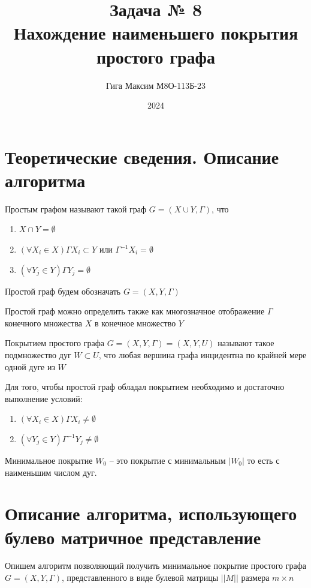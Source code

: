 \documentclass[12pt]{article}
\title{Задача № 8 \\ 
Нахождение наименьшего покрытия простого графа}
\author{Гига Максим М8О-113Б-23}
\date{2024}
\begin{document}
\maketitle
\setcounter{page}{16}

\section{Теоретические сведения. Описание алгоритма}

Простым графом называют такой граф $G = (X \cup Y, \Gamma)$, что
\begin{enumerate}
    \item $X \cap Y = \emptyset$
    \item $(\forall X_i \in X) \Gamma X_i \subset Y$
          или $\Gamma^{-1} X_i = \emptyset$
    \item $(\forall Y_j \in Y) \Gamma Y_j = \emptyset$
\end{enumerate}

Простой граф будем обозначать $G = (X, Y, \Gamma)$

Простой граф можно определить также как многозначное
отображение $\Gamma$ конечного множества $X$ в конечное
множество $Y$

Покрытием простого графа $G = (X, Y, \Gamma) = (X, Y, U)$ называют
такое подмножество дуг $W \subset U$, что любая вершина графа
инцидентна по крайней мере одной дуге из $W$

Для того, чтобы простой граф обладал покрытием необходимо и достаточно
выполнение условий:
\begin{enumerate}
    \item $(\forall X_i \in X) \Gamma X_i \ne \emptyset$
    \item $(\forall Y_j \in Y) \Gamma^{-1} Y_j \ne \emptyset$
\end{enumerate}

Минимальное покрытие $W_0$ – это покрытие с минимальным $|W_0|$
то есть с наименьшим числом дуг.

\section{Описание алгоритма, использующего булево
  матричное представление}

Опишем алгоритм позволяющий получить минимальное покрытие
простого графа \\ $G = (X, Y, \Gamma)$, представленного
в виде булевой матрицы $||M||$ размера $m \times n$
\end{document}
